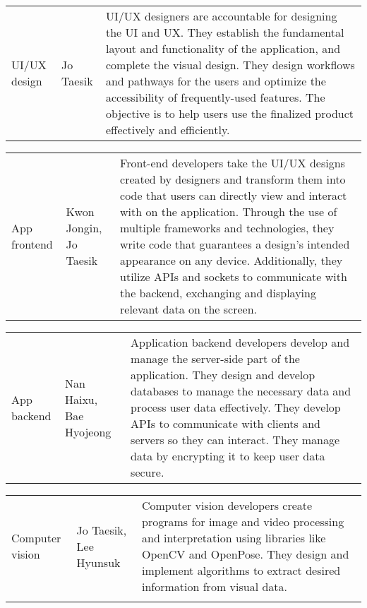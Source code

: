 \begin{enumerate}[label=\arabic*]
          \begin{table}[H]
              \center
              \begin{tabular}{m{1.4cm} m{1.5cm} m{4cm}}
                  UI/UX design & Jo Taesik & UI/UX designers are accountable for designing the UI and UX. They establish the fundamental layout and functionality of the application, and complete the visual design. They design workflows and pathways for the users and optimize the accessibility of frequently-used features. The objective is to help users use the finalized product effectively and efficiently. \\
              \end{tabular}
          \end{table}

          \begin{table}[H]
              \center
              \begin{tabular}{m{1.4cm} m{1.5cm} m{4cm}}
                  App frontend & Kwon Jongin, Jo Taesik & Front-end developers take the UI/UX designs created by designers and transform them into code that users can directly view and interact with on the application. Through the use of multiple frameworks and technologies, they write code that guarantees a design’s intended appearance on any device. Additionally, they utilize APIs and sockets to communicate with the backend, exchanging and displaying relevant data on the screen. \\
              \end{tabular}
          \end{table}

          \begin{table}[H]
              \center
              \begin{tabular}{m{1.4cm} m{1.5cm} m{4cm}}
                  App backend & Nan Haixu, Bae Hyojeong & Application backend developers develop and manage the server-side part of the application. They design and develop databases to manage the necessary data and process user data effectively. They develop APIs to communicate with clients and servers so they can interact. They manage data by encrypting it to keep user data secure. \\
              \end{tabular}
          \end{table}

          \begin{table}[H]
              \center
              \begin{tabular}{m{1.4cm} m{1.5cm} m{4cm}}
                  Computer vision & Jo Taesik, Lee Hyunsuk & Computer vision developers create programs for image and video processing and interpretation using libraries like OpenCV and OpenPose. They design and implement algorithms to extract desired information from visual data. \\\\
                  \bottomrule
              \end{tabular}
          \end{table}


\end{enumerate}
